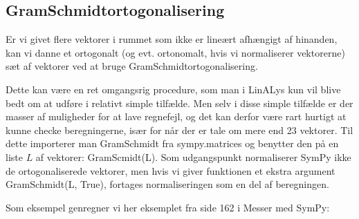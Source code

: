 \documentclass[letterpaper,10pt,english]{jupyterBook}
\begin{document}
\begin{sphinxVerbatim}[commandchars=\\\{\}]
\end{sphinxVerbatim}

\noindent{}


\subsection{Gram\sphinxhyphen{}Schmidt\sphinxhyphen{}ortogonalisering}
\label{\detokenize{notebooks/sympy/Notebook_LinAlg_2:gram-schmidt-ortogonalisering}}
Er vi givet flere vektorer i rummet som ikke er lineært afhængigt af hinanden, kan vi danne et ortogonalt (og evt. ortonomalt, hvis vi normaliserer vektorerne) sæt af vektorer ved at bruge Gram\sphinxhyphen{}Schmidt\sphinxhyphen{}ortogonalisering.

Dette kan være en ret omgangsrig procedure, som man i LinALys kun vil blive bedt om at udføre i relativt simple tilfælde. Men selv i disse simple tilfælde er der masser af muligheder for at lave regnefejl, og det kan derfor være rart hurtigt at kunne checke beregningerne, især for når der er tale om mere end 2\sphinxhyphen{}3 vektorer. Til dette importerer man GramSchmidt fra sympy.matrices og benytter den på en liste \(L\) af vektorer: GramScmidt(L). Som udgangspunkt normaliserer SymPy ikke de ortogonaliserede vektorer, men hvis vi giver funktionen et ekstra argument GramSchmidt(L, True), fortages normaliseringen som en del af beregningen.

Som eksempel genregner vi her eksemplet fra side 162 i Messer med SymPy:

\begin{sphinxVerbatim}[commandchars=\\\{\}]
   

  \PYG{p}{[}\PYG{p}{[}  \PYG{p}{]} \PYG{p}{[}  \PYG{p}{]} \PYG{p}{[}  \PYG{p}{]}\PYG{p}{]}
\end{sphinxVerbatim}
\end{document}
